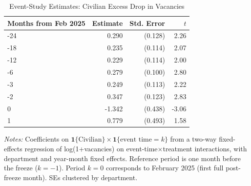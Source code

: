 \begin{table}[!ht]
\centering
\caption{Event-Study Estimates: Civilian Excess Drop in Vacancies}
\label{tab:event}
\small
\begin{tabular}{lrrr}
\toprule
Months from Feb 2025 & Estimate & Std. Error & $t$ \\
\midrule
-24 & 0.290 & (0.128) & 2.26 \\
-18 & 0.235 & (0.114) & 2.07 \\
-12 & 0.229 & (0.114) & 2.00 \\
-6 & 0.279 & (0.100) & 2.80 \\
-3 & 0.249 & (0.113) & 2.22 \\
-2 & 0.347 & (0.123) & 2.83 \\
0 & -1.342 & (0.438) & -3.06 \\
1 & 0.779 & (0.493) & 1.58 \\
\bottomrule
\end{tabular}
\begin{minipage}{0.92\textwidth}
\footnotesize\textit{Notes:} Coefficients on $\mathbf{1}\{\text{Civilian}\}\times\mathbf{1}\{\text{event time}=k\}$ from a two-way fixed-effects regression of log(1+vacancies) on event-time$\times$treatment interactions, with department and year-month fixed effects. Reference period is one month before the freeze ($k=-1$). Period $k=0$ corresponds to February 2025 (first full post-freeze month). SEs clustered by department.
\end{minipage}
\end{table}

